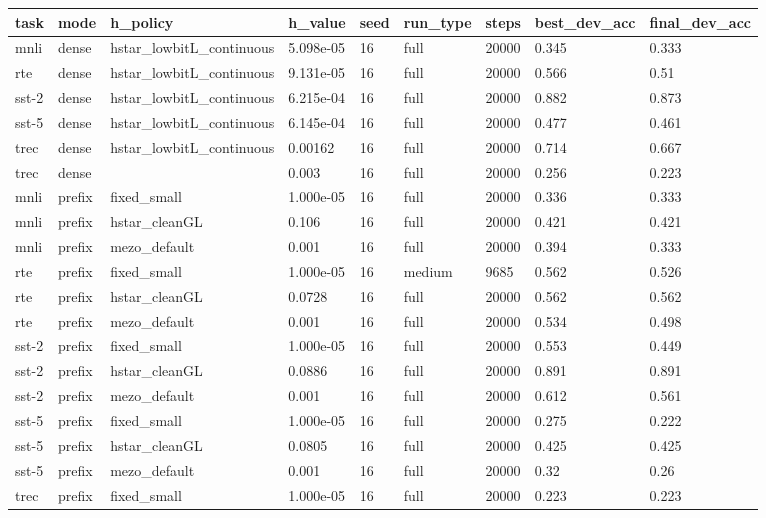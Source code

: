 \begin{table}[t]
\centering
\small
\begin{tabular}{lllllllll}
\toprule
task & mode & h\_policy & h\_value & seed & run\_type & steps & best\_dev\_acc & final\_dev\_acc \\
\midrule
mnli & dense & hstar\_lowbitL\_continuous & 5.098e-05 & 16 & full & 20000 & 0.345 & 0.333 \\
rte & dense & hstar\_lowbitL\_continuous & 9.131e-05 & 16 & full & 20000 & 0.566 & 0.51 \\
sst-2 & dense & hstar\_lowbitL\_continuous & 6.215e-04 & 16 & full & 20000 & 0.882 & 0.873 \\
sst-5 & dense & hstar\_lowbitL\_continuous & 6.145e-04 & 16 & full & 20000 & 0.477 & 0.461 \\
trec & dense & hstar\_lowbitL\_continuous & 0.00162 & 16 & full & 20000 & 0.714 & 0.667 \\
trec & dense &  & 0.003 & 16 & full & 20000 & 0.256 & 0.223 \\
mnli & prefix & fixed\_small & 1.000e-05 & 16 & full & 20000 & 0.336 & 0.333 \\
mnli & prefix & hstar\_cleanGL & 0.106 & 16 & full & 20000 & 0.421 & 0.421 \\
mnli & prefix & mezo\_default & 0.001 & 16 & full & 20000 & 0.394 & 0.333 \\
rte & prefix & fixed\_small & 1.000e-05 & 16 & medium & 9685 & 0.562 & 0.526 \\
rte & prefix & hstar\_cleanGL & 0.0728 & 16 & full & 20000 & 0.562 & 0.562 \\
rte & prefix & mezo\_default & 0.001 & 16 & full & 20000 & 0.534 & 0.498 \\
sst-2 & prefix & fixed\_small & 1.000e-05 & 16 & full & 20000 & 0.553 & 0.449 \\
sst-2 & prefix & hstar\_cleanGL & 0.0886 & 16 & full & 20000 & 0.891 & 0.891 \\
sst-2 & prefix & mezo\_default & 0.001 & 16 & full & 20000 & 0.612 & 0.561 \\
sst-5 & prefix & fixed\_small & 1.000e-05 & 16 & full & 20000 & 0.275 & 0.222 \\
sst-5 & prefix & hstar\_cleanGL & 0.0805 & 16 & full & 20000 & 0.425 & 0.425 \\
sst-5 & prefix & mezo\_default & 0.001 & 16 & full & 20000 & 0.32 & 0.26 \\
trec & prefix & fixed\_small & 1.000e-05 & 16 & full & 20000 & 0.223 & 0.223 \\

\end{tabular}
\end{table}
